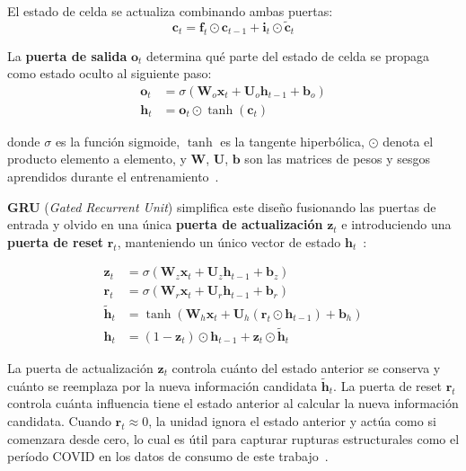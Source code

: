 \documentclass[12pt, a4paper]{article}
\begin{document}
El estado de celda se actualiza combinando ambas puertas:
\begin{equation}
\mathbf{c}_t = \mathbf{f}_t \odot \mathbf{c}_{t-1} + \mathbf{i}_t \odot \tilde{\mathbf{c}}_t
\end{equation}

La \textbf{puerta de salida} $\mathbf{o}_t$ determina qué parte del estado de celda se propaga como estado oculto al siguiente paso:
\begin{align}
\mathbf{o}_t &= \sigma(\mathbf{W}_o \mathbf{x}_t + \mathbf{U}_o \mathbf{h}_{t-1} + \mathbf{b}_o) \\
\mathbf{h}_t &= \mathbf{o}_t \odot \tanh(\mathbf{c}_t)
\end{align}

donde $\sigma$ es la función sigmoide, $\tanh$ es la tangente hiperbólica, $\odot$ denota el producto elemento a elemento, y $\mathbf{W}$, $\mathbf{U}$, $\mathbf{b}$ son las matrices de pesos y sesgos aprendidos durante el entrenamiento~\cite{hochreiter1997}.

\textbf{GRU} (\textit{Gated Recurrent Unit}) simplifica este diseño fusionando las puertas de entrada y olvido en una única \textbf{puerta de actualización} $\mathbf{z}_t$ e introduciendo una \textbf{puerta de reset} $\mathbf{r}_t$, manteniendo un único vector de estado $\mathbf{h}_t$~\cite{cho2014}:

\begin{align}
\mathbf{z}_t &= \sigma(\mathbf{W}_z \mathbf{x}_t + \mathbf{U}_z \mathbf{h}_{t-1} + \mathbf{b}_z) \\
\mathbf{r}_t &= \sigma(\mathbf{W}_r \mathbf{x}_t + \mathbf{U}_r \mathbf{h}_{t-1} + \mathbf{b}_r) \\
\tilde{\mathbf{h}}_t &= \tanh(\mathbf{W}_h \mathbf{x}_t + \mathbf{U}_h (\mathbf{r}_t \odot \mathbf{h}_{t-1}) + \mathbf{b}_h) \\
\mathbf{h}_t &= (1 - \mathbf{z}_t) \odot \mathbf{h}_{t-1} + \mathbf{z}_t \odot \tilde{\mathbf{h}}_t
\end{align}

La puerta de actualización $\mathbf{z}_t$ controla cuánto del estado anterior se conserva y cuánto se reemplaza por la nueva información candidata $\tilde{\mathbf{h}}_t$. La puerta de reset $\mathbf{r}_t$ controla cuánta influencia tiene el estado anterior al calcular la nueva información candidata. Cuando $\mathbf{r}_t \approx 0$, la unidad ignora el estado anterior y actúa como si comenzara desde cero, lo cual es útil para capturar rupturas estructurales como el período COVID en los datos de consumo de este trabajo~\cite{cho2014}.
\end{document}
